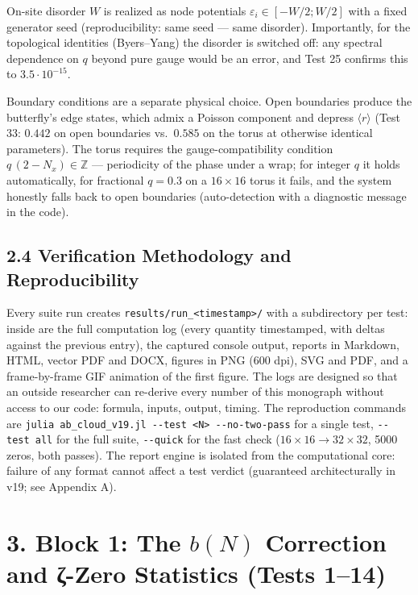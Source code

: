 \documentclass[
]{article}
\begin{document}
On-site disorder \(W\) is realized as node potentials
\(\varepsilon_i\in[-W/2;W/2]\) with a fixed generator seed
(reproducibility: same seed --- same disorder). Importantly, for the
topological identities (Byers--Yang) the disorder is switched off: any
spectral dependence on \(q\) beyond pure gauge would be an error, and
Test 25 confirms this to \(3.5\cdot10^{-15}\).

Boundary conditions are a separate physical choice. Open boundaries
produce the butterfly's edge states, which admix a Poisson component and
depress \(\langle r\rangle\) (Test 33: \(0.442\) on open boundaries
vs.~\(0.585\) on the torus at otherwise identical parameters). The torus
requires the gauge-compatibility condition \(q\,(2-N_x)\in\mathbb{Z}\)
--- periodicity of the phase under a wrap; for integer \(q\) it holds
automatically, for fractional \(q=0.3\) on a \(16\times16\) torus it
fails, and the system honestly falls back to open boundaries
(auto-detection with a diagnostic message in the code).

\subsection{2.4 Verification Methodology and
Reproducibility}\label{verification-methodology-and-reproducibility}

Every suite run creates
\texttt{results/run\_\textless{}timestamp\textgreater{}/} with a
subdirectory per test: inside are the full computation log (every
quantity timestamped, with deltas against the previous entry), the
captured console output, reports in Markdown, HTML, vector PDF and DOCX,
figures in PNG (600 dpi), SVG and PDF, and a frame-by-frame GIF
animation of the first figure. The logs are designed so that an outside
researcher can re-derive every number of this monograph without access
to our code: formula, inputs, output, timing. The reproduction commands
are
\texttt{julia\ ab\_cloud\_v19.jl\ -\/-test\ \textless{}N\textgreater{}\ -\/-no-two-pass}
for a single test, \texttt{-\/-test\ all} for the full suite,
\texttt{-\/-quick} for the fast check (\(16\times16\to32\times32\), 5000
zeros, both passes). The report engine is isolated from the
computational core: failure of any format cannot affect a test verdict
(guaranteed architecturally in v19; see Appendix A).

\section{\texorpdfstring{3. Block 1: The \(b(N)\) Correction and ζ-Zero
Statistics (Tests
1--14)}{3. Block 1: The b(N) Correction and ζ-Zero Statistics (Tests 1--14)}}\label{block-1-the-bn-correction-and-ux3b6-zero-statistics-tests-114}
\end{document}
